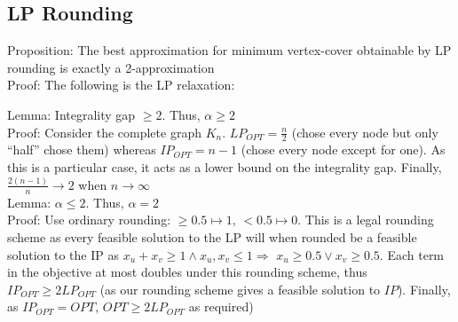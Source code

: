 \documentclass[20pt,a4paper,landscape]{extarticle}
\begin{document}
\begin{flushleft}
\subsection{LP Rounding}
\item Proposition: The best approximation for minimum vertex-cover obtainable by LP rounding is exactly a 2-approximation\\
Proof: The following is the LP relaxation:
\begin{lpformulation}
\end{lpformulation}
Lemma: Integrality gap $\geq 2$. Thus, $\alpha \geq 2$\\
Proof: Consider the complete graph $K_n$. $LP_{OPT} = \frac{n}{2}$ (chose every node but only ``half'' chose them) whereas $IP_{OPT} = n-1$ (chose every node except for one). As this is a particular case, it acts as a lower bound on the integrality gap. Finally, $\frac{2(n-1)}{n} \to 2$ when $n \to \infty$\\
\clearpage
Lemma: $\alpha \leq 2$. Thus, $\alpha = 2$\\
Proof: Use ordinary rounding: $\geq 0.5 \mapsto 1$, $< 0.5 \mapsto 0$. This is a legal rounding scheme as every feasible solution to the LP will when rounded be a feasible solution to the IP as $x_u + x_v \geq 1 \land x_u, x_v \leq 1 \Rightarrow$ $x_u \geq 0.5 \lor x_v \geq 0.5$. Each term in the objective at most doubles under this rounding scheme, thus $IP_{OPT} \geq 2 LP_{OPT}$ (as our rounding scheme gives a feasible solution to $IP$). Finally, as $IP_{OPT} = OPT$, $OPT \geq 2 LP_{OPT}$ as required)

\end{flushleft}
\end{document}
